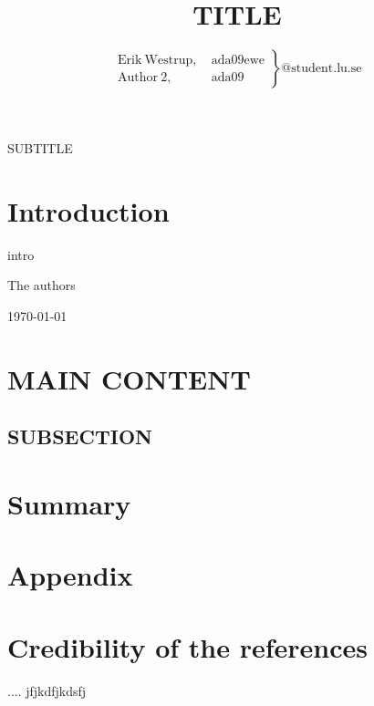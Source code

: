 \documentclass[10pt,journal,compsoc,final,twoside,twocolumn,a4paper]{IEEEtran}
\begin{document}
\title{TITLE}

\author{
\begin{math}
\left. \begin{array}{ll} 
	\mathrm{Erik~Westrup,} & \mathrm{~ada09ewe} \\
	\mathrm{Author~2,} & \mathrm{~ada09}
\end{array} \right\}\mathrm{@student.lu.se}
\end{math}
}

{SUBTITLE}

\maketitle
\IEEEdisplaynotcompsoctitleabstractindextext
\IEEEpeerreviewmaketitle

\section{Introduction}

 intro


\hfill The authors

\hfill \today


\section{MAIN CONTENT}
\lipsum[1-2]

\subsection{SUBSECTION}
\lipsum[1]

\section{Summary}




\newpage
\section*{Appendix}
\appendices
\section{Credibility of the references}

\emph{\cite{dummy+ref}} .... jfjkdfjkdsfj
\end{document}
